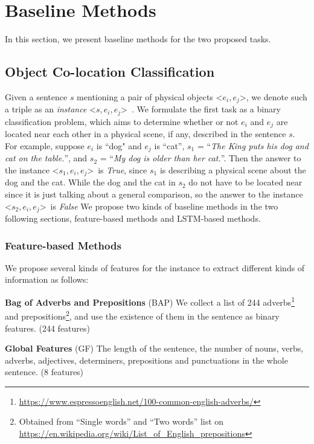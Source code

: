 \section{Baseline Methods}
\label{sec:method}
In this section, we present baseline methods for 
the two proposed tasks. 

\subsection{Object Co-location Classification}
\label{sec:classify} 
Given a sentence $s$ mentioning a pair of physical objects 
\textless$e_i,e_j$\textgreater, 
we denote such a triple as an \textit{instance} \textless$s,e_i,e_j$\textgreater~. 
We formulate the first task as a binary classification problem, which aims to determine whether or not $e_i$ and $e_j$ are located near each other 
in a physical scene, if any, described in the sentence $s$.
For example, suppose $e_i$ is ``dog" and $e_j$ is ``cat'', $s_1$ = ``\textit{The King puts his dog and cat on the table.}'', 
and $s_2$ = ``\textit{My dog is older than her cat.}''.
Then the answer to the instance \textless$s_1,e_i,e_j$\textgreater ~is \textit{True}, 
since $s_1$ is describing a physical scene about the dog and the cat.
While the dog and the cat in $s_2$ do not have to be located near since it is just talking about a general comparison, so the answer to  the instance \textless$s_2,e_i,e_j$\textgreater ~is \textit{False}
We propose two kinds of baseline methods in the two following sections, feature-based methods and LSTM-based methods.
\subsubsection{Feature-based Methods}
We propose several kinds of features for the instance to extract different kinds of information as follows:

\textbf{Bag of Adverbs and Prepositions} (BAP) We collect a list of 244 adverbs\footnote{\url{https://www.espressoenglish.net/100-common-english-adverbs/}} and prepositions\footnote{Obtained from ``Single words'' and ``Two words'' list on \url{https://en.wikipedia.org/wiki/List_of_English_prepositions}}, and use the existence of them in the sentence as binary features. (244 features)

\textbf{Global Features} (GF) The length of the sentence, the number of nouns, verbs, adverbs, adjectives, determiners, prepositions and punctuations in the whole sentence. (8 features)

